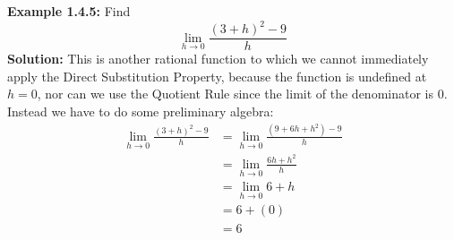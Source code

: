 \documentclass{article}
\begin{document}
	\textbf{Example 1.4.5:} Find 
	$$\lim_{h \to 0}{\frac{(3 + h)^2 - 9}{h}}$$
	\textbf{Solution:} This is another rational function to which we cannot immediately apply the Direct Substitution Property, because the function is undefined at $h = 0$, nor can we use the Quotient Rule since the limit of the denominator is $0$. Instead we have to do some preliminary algebra:
	\begin{align*}
		\lim_{h \to 0}{\frac{(3 + h)^2 - 9}{h}} &= \lim_{h \to 0}{\frac{(9 + 6h + h^2) - 9}{h}} \\
		 &= \lim_{h \to 0}{\frac{6h + h^2}{h}} \\
		 &= \lim_{h \to 0}{6 + h} \tag{Theorem 1.4.12} \\
		 &= 6 + (0) \tag{Theorem 1.4.8} \\
		 &= 6
	\end{align*}
\end{document}
